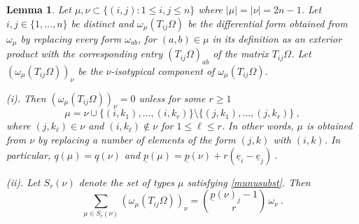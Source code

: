 \documentclass[10pt]{amsart}
\newcommand{\pp}{{\underline{p}}}
\newcommand{\qq}{{\underline{q}}}
\newcommand{\eee}{{\underline{e}}}
\theoremstyle{plain}
\newtheorem{lem}[thm]{Lemma}
\newcommand{\0}{\color{blue}{\mathsf{0}}}
\begin{document}
\begin{lem} \label{lem: TijOmega}  Let $\mu, \nu \subset \{(i,j): 1\leq i, j \leq n\}$ where $|\mu|= |\nu|=2n-1$. Let $i,j\in \{1,\ldots, n\}$ be distinct and $\omega_{\mu}(T_{ij} \Omega)$
be the differential form obtained from $\omega_\mu$ by replacing every form   $\omega_{ab}$, for $(a,b)\in \mu$ in its definition as an exterior product with the corresponding  entry  $(T_{ij} \Omega)_{ab}$ of the matrix $T_{ij} \Omega$.
Let $(\omega_{\mu}(T_{ij} \Omega))_{\nu}$ be the $\nu$-isotypical component of $\omega_{\mu}(T_{ij} \Omega)$.

(i).   Then  $(\omega_{\mu}(T_{ij} \Omega))_{\nu}=0$ unless for some $r\geq 1$
\begin{equation}  \label{munusubst} \mu = \nu \cup \{ (i,k_1),\ldots, (i,k_r)\} \setminus  \{(j,k_1), \ldots, (j,k_r) \} \ , \end{equation}
where $(j,k_\ell) \in \nu$ and $(i,k_\ell) \notin \nu$ for $1\leq \ell \leq r$. In other words, $\mu$ is obtained from $\nu$ by replacing a number of elements of the form $(j,k)$ with $(i,k)$. 
 In particular, $\qq(\mu) = \qq(\nu)$ and $\pp(\mu) = \pp(\nu) + r (\eee_i -\eee_j)\ .$
 
(ii).  Let $S_r(\nu)$ denote the set of types $\mu$ satisfying \eqref{munusubst}. Then 
\begin{equation}\label{eq: TijOmega}
\sum_{\mu \in S_r(\nu)}  (\omega_{\mu} (T_{ij} \Omega))_{\nu} = \binom{\pp(\nu)_j-1}{r}\, \omega_{\nu} \ .
\end{equation}
\end{lem}
\end{document}
